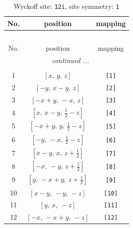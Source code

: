 \documentclass[fleqn,8pt]{jsarticle}
\begin{document}
\renewcommand{\arraystretch}{1.2}
\begin{longtable}{ccc}
\caption{Wyckoff site: {\tt 12i}, site symmetry: {\tt 1}}
 \\
 \hline \hline
No. & position & mapping \\ \hline \endfirsthead

\multicolumn{2}{l}{\tablename\ \thetable{}} \\
 \hline \hline
No. & position & mapping \\ \hline \endhead

 \hline \hline
\multicolumn{2}{r}{\footnotesize\it continued ...} \\ \endfoot

 \hline \hline
\multicolumn{2}{r}{} \\ \endlastfoot

1 & $\left[ x,\, y,\, z \right]$ & {\tt [1]} \\ \hline
2 & $\left[ - y,\, x - y,\, z \right]$ & {\tt [2]} \\ \hline
3 & $\left[ - x + y,\, - x,\, z \right]$ & {\tt [3]} \\ \hline
4 & $\left[ x,\, x - y,\, \frac{1}{2} - z \right]$ & {\tt [4]} \\ \hline
5 & $\left[ - x + y,\, y,\, \frac{1}{2} - z \right]$ & {\tt [5]} \\ \hline
6 & $\left[ - y,\, - x,\, \frac{1}{2} - z \right]$ & {\tt [6]} \\ \hline
7 & $\left[ x - y,\, x,\, z + \frac{1}{2} \right]$ & {\tt [7]} \\ \hline
8 & $\left[ - x,\, - y,\, z + \frac{1}{2} \right]$ & {\tt [8]} \\ \hline
9 & $\left[ y,\, - x + y,\, z + \frac{1}{2} \right]$ & {\tt [9]} \\ \hline
10 & $\left[ x - y,\, - y,\, - z \right]$ & {\tt [10]} \\ \hline
11 & $\left[ y,\, x,\, - z \right]$ & {\tt [11]} \\ \hline
12 & $\left[ - x,\, - x + y,\, - z \right]$ & {\tt [12]} \\
\end{longtable}
\end{document}
